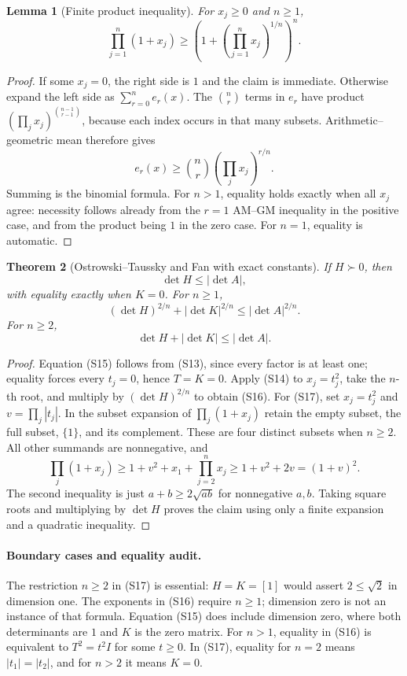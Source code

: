 \documentclass[11pt,a4paper]{article}
\newtheorem{theorem}{Theorem}[section]
\newtheorem{lemma}[theorem]{Lemma}
\theoremstyle{definition}
\begin{document}
\begin{lemma}[Finite product inequality]
For $x_j\ge0$ and $n\ge1$,
\[
 \prod_{j=1}^n(1+x_j)\ge
   \left(1+\left(\prod_{j=1}^nx_j\right)^{1/n}\right)^n.
 \tag{S14}
\]
\end{lemma}
\begin{proof}
If some $x_j=0$, the right side is $1$ and the claim is immediate.
Otherwise expand the left side as $\sum_{r=0}^n e_r(x)$.
The $\binom nr$ terms in $e_r$ have product
$(\prod_jx_j)^{\binom{n-1}{r-1}}$, because each index occurs in that
many subsets. Arithmetic--geometric mean therefore gives
\[
 e_r(x)\ge\binom nr\left(\prod_jx_j\right)^{r/n}.
\]
Summing is the binomial formula. For $n>1$, equality holds exactly
when all $x_j$ agree: necessity follows already from the $r=1$
AM--GM inequality in the positive case, and from the product being
$1$ in the zero case. For $n=1$, equality is automatic.
\end{proof}

\begin{theorem}[Ostrowski--Taussky and Fan with exact constants]
If $H\succ0$, then
\[
 \det H\le|\det A|,
 \tag{S15}
\]
with equality exactly when $K=0$. For $n\ge1$,
\[
 (\det H)^{2/n}+|\det K|^{2/n}\le|\det A|^{2/n}.
 \tag{S16}
\]
For $n\ge2$,
\[
 \det H+|\det K|\le|\det A|.
 \tag{S17}
\]
\end{theorem}
\begin{proof}
Equation (S15) follows from (S13), since every factor is at least one;
equality forces every $t_j=0$, hence $T=K=0$.
Apply (S14) to $x_j=t_j^2$, take the $n$-th root, and multiply by
$(\det H)^{2/n}$ to obtain (S16).
For (S17), set $x_j=t_j^2$ and $v=\prod_j|t_j|$.
In the subset expansion of $\prod_j(1+x_j)$ retain the empty subset,
the full subset, $\{1\}$, and its complement. These are four distinct
subsets when $n\ge2$. All other summands are nonnegative, and
\[
 \prod_j(1+x_j)\ge1+v^2+x_1+\prod_{j=2}^n x_j
       \ge1+v^2+2v=(1+v)^2.
\]
The second inequality is just $a+b\ge2\sqrt{ab}$ for nonnegative
$a,b$. Taking square roots and multiplying by $\det H$ proves the
claim using only a finite expansion and a quadratic inequality.
\end{proof}

\paragraph{Boundary cases and equality audit.}
The restriction $n\ge2$ in (S17) is essential:
$H=K=[1]$ would assert $2\le\sqrt2$ in dimension one.
The exponents in (S16) require $n\ge1$; dimension zero is not an
instance of that formula. Equation (S15) does include dimension zero,
where both determinants are $1$ and $K$ is the zero matrix.
For $n>1$, equality in (S16) is equivalent to
$T^2=t^2I$ for some $t\ge0$. In (S17), equality for $n=2$ means
$|t_1|=|t_2|$, and for $n>2$ it means $K=0$.
\end{document}
